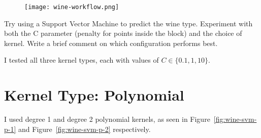 \documentclass[
  coursecode={CMPE 251},
  assignmentname={Exercise \exercisenumber},
  studentnumber=20053722,
  name={Bryan Hoang},
  draft,
]{
  ltxanswer%
}
\begin{document}
  \begin{figure}
    \texttt{[image: wine-workflow.png]}
    \label{fig:wine-workflow-unnormalized}
  \end{figure}

  \begin{questions}
    \question[2]{}
    Try using a Support Vector Machine to predict the wine type. Experiment with both the C parameter (penalty for points inside the block) and the choice of kernel. Write a brief comment on which configuration performs best.
    \begin{solution}
      I tested all three kernel types, each with values of \(C\in\{0.1,1,10\}\).

      \section*{Kernel Type: Polynomial}
      I used degree 1 and degree 2 polynomial kernels, as seen in Figure~\ref{fig:wine-svm-p-1} and Figure~\ref{fig:wine-svm-p-2} respectively.

      \newpage


\end{solution}
\end{questions}
\end{document}
